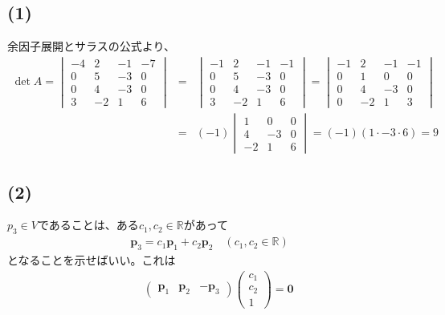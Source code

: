 \documentclass[11pt, titlepage]{jsarticle}
\begin{document}
\subsection*{(1)}
余因子展開とサラスの公式より、
\begin{eqnarray*}
  \det A = 
  \begin{vmatrix}
    -4 & 2  & -1 & -7 \\
    0  & 5  & -3 & 0  \\
    0  & 4  & -3 & 0  \\
    3  & -2 & 1  & 6
  \end{vmatrix}&=&
  \begin{vmatrix}
    -1 & 2  & -1 & -1 \\
    0  & 5  & -3 & 0  \\
    0  & 4  & -3 & 0  \\
    3  & -2 & 1  & 6
  \end{vmatrix}=
  \begin{vmatrix}
    -1 & 2  & -1 & -1 \\
    0  & 1  & 0  & 0  \\
    0  & 4  & -3 & 0  \\
    0  & -2 & 1  & 3
  \end{vmatrix}\\
  &=& (-1)
  \begin{vmatrix}
    1  & 0  & 0 \\
    4  & -3 & 0 \\
    -2 & 1  & 6
  \end{vmatrix}
  = (-1)(1\cdot-3\cdot6)=9
\end{eqnarray*}

\newpage
\subsection*{(2)}
$p_3\in V$であることは、ある$c_1, c_2\in \mathbb{R}$があって
\begin{eqnarray*}
  \boldsymbol p_3 = c_1 \boldsymbol p_1 + c_2 \boldsymbol p_2 \quad (c_1, c_2 \in \mathbb R)
\end{eqnarray*}
となることを示せばいい。これは
\begin{eqnarray*}
  &&\begin{pmatrix}
    \boldsymbol p_1 & \boldsymbol p_2 & -\boldsymbol p_3
  \end{pmatrix}\begin{pmatrix}
    c_1 \\
    c_2 \\
    1
  \end{pmatrix}=\boldsymbol 0
\end{eqnarray*}
\end{document}
